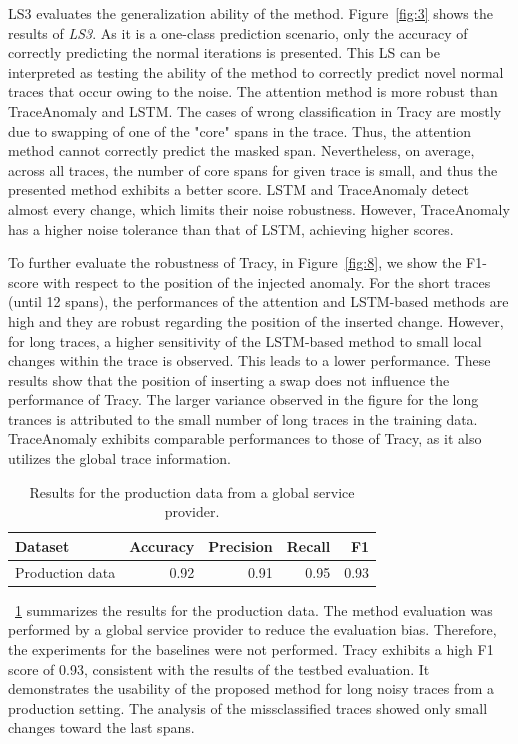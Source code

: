 LS3 evaluates the generalization ability of the method. Figure~\ref{fig:3} shows the results of \textit{LS3}. As it is a one-class prediction scenario, only the accuracy of correctly predicting the normal iterations is presented. This LS can be interpreted as testing the ability of the method to correctly predict novel normal traces that occur owing to the noise. The attention method is more robust than TraceAnomaly and LSTM. The cases of wrong classification in Tracy are mostly due to swapping of one of the "core" spans in the trace. Thus, the attention method cannot correctly predict the masked span. Nevertheless, on average, across all traces, the number of core spans for given trace is small, and thus the presented method exhibits a better score. LSTM and TraceAnomaly detect almost every change, which limits their noise robustness. However, TraceAnomaly has a higher noise tolerance than that of LSTM, achieving higher scores. 

To further evaluate the robustness of Tracy, in Figure~\ref{fig:8}, we show the F1-score with respect to the position of the injected anomaly. For the short traces (until 12 spans), the performances of the attention and LSTM-based methods are high and they are robust regarding the position of the inserted change. However, for long traces, a higher sensitivity of the LSTM-based method to small local changes within the trace is observed. This leads to a lower performance. These results show that the position of inserting a swap does not influence the performance of Tracy. The larger variance observed in the figure for the long trances is attributed to the small number of long traces in the training data. TraceAnomaly exhibits comparable performances to those of Tracy, as it also utilizes the global trace information.



\begin{table}[!t]
\centering
   \caption{Results for the production data from a global service provider.}

   \label{tab:1}
   \begin{tabular}{lrrrr}
     \toprule
     Dataset & Accuracy & Precision & Recall & F1  \\
     \midrule
     Production data & 0.92 & 0.91 & 0.95 & 0.93    \\
     \bottomrule
   \end{tabular}
\end{table}

\tablename~\ref{tab:1} summarizes the results for the production data. The method evaluation was performed by a global service provider to reduce the evaluation bias. Therefore, the experiments for the baselines were not performed. Tracy exhibits a high F1 score of 0.93, consistent with the results of the testbed evaluation. It demonstrates the usability of the proposed method for long noisy traces from a production setting. The analysis of the missclassified traces showed only small changes toward the last spans. 

